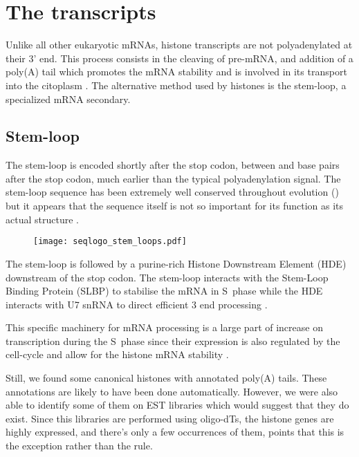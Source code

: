 \section{The transcripts}
  Unlike all other eukaryotic mRNAs, histone transcripts are not polyadenylated at
  their 3' end. This process consists in the cleaving of pre-mRNA, and addition of a
  poly(A) tail which promotes the mRNA stability and is involved in its transport
  into the citoplasm \citep{mRNA-end-processing}. The alternative method used by
  histones is the stem-loop, a specialized mRNA secondary.

  \subsection{Stem-loop}
    The stem-loop is encoded shortly after the stop codon, between \StemLoopStart{} and
    \StemLoopStart{} base pairs after the stop codon, much earlier than the typical
    polyadenylation signal. The stem-loop sequence has been extremely well conserved
    throughout evolution () but it appears that the
    sequence itself is not so important for its function as its actual structure
    \citep{stem-loop-structure}.

    \begin{figure}
      \centering
      \texttt{[image: seqlogo\_stem\_loops.pdf]}
      \label{fig:stem-loop-seqlogo}
    \end{figure}

    The stem-loop is followed by a purine-rich Histone Downstream Element (HDE)
    downstream of the stop codon. The stem-loop interacts with the Stem-Loop
    Binding Protein (SLBP) to stabilise the mRNA in S~phase \citep{SLBP-regulation}
    while the HDE interacts with U7 snRNA to direct efficient 3 end processing
    \citep{HDE-sequence}.


    This specific machinery for mRNA processing is a large part of increase on
    transcription during the S~phase since their expression is also regulated
    by the cell-cycle \addref and allow for the histone mRNA stability \addref.

    Still, we found some canonical histones with annotated poly(A) tails. These annotations
    are likely to have been done automatically. However, we were also able to identify
    some of them on EST libraries which would suggest that they do exist. Since
    this libraries are performed using oligo-dTs, the histone genes are highly
    expressed, and there's only a few occurrences of them, points that this is
    the exception rather than the rule.

